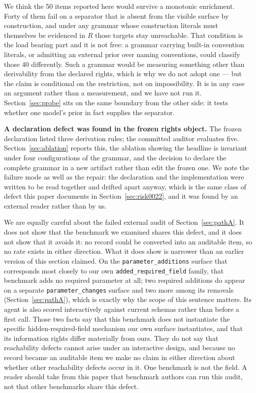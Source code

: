 \documentclass[11pt]{article}
\newcommand{\dfam}[1]{\texttt{#1}}
\begin{document}
We think the 50 items reported here would survive a monotonic enrichment. Forty
of them fail on a separator that is absent from the visible surface by
construction, and under any grammar whose construction literals must themselves
be evidenced in $R$ those targets stay unreachable. That condition is the load
bearing part and it is not free: a grammar carrying built-in convention
literals, or admitting an external prior over naming conventions, could
classify those 40 differently. Such a grammar would be measuring something
other than derivability from the declared rights, which is why we do not adopt
one --- but the claim is conditional on the restriction, not on impossibility.
It is in any case an argument rather than a measurement, and we have not run
it. Section~\ref{sec:probe} sits on the same boundary from the other side: it
tests whether one model's prior in fact supplies the separator.

\textbf{A declaration defect was found in the frozen rights object.} The frozen
declaration listed three derivation rules; the committed auditor evaluates
five. Section~\ref{sec:ablation} reports this, the ablation showing the
headline is invariant under four configurations of the grammar, and the
decision to declare the complete grammar in a new artifact rather than edit the
frozen one. We note the failure mode as well as the repair: the declaration and
the implementation were written to be read together and drifted apart anyway,
which is the same class of defect this paper documents in
Section~\ref{sec:risk0022}, and it was found by an external reader rather than
by us.

We are equally careful about the failed external audit of
Section~\ref{sec:pathA}. It does not show that the benchmark we examined shares
this defect, and it does not show that it avoids it: no record could be
converted into an auditable item, so no rate exists in either direction. What
it does show is narrower than an earlier version of this section claimed. On
the \texttt{parameter\_additions} surface that corresponds most closely to our
own \dfam{added\_required\_field} family, that benchmark adds no required
parameter at all; two required additions do appear on a separate
\texttt{parameter\_changes} surface and two more among its removals
(Section~\ref{sec:pathA}), which is exactly why the scope of this sentence
matters. Its agent is also scored interactively against current schemas rather
than before a first call. Those two facts say that this benchmark does not
instantiate the specific hidden-required-field mechanism our own surface
instantiates, and that its information rights differ materially from ours. They
do not say that reachability defects cannot arise under an interactive design,
and because no record became an auditable item we make no claim in either
direction about whether other reachability defects occur in it. One benchmark
is not the field. A reader should take from this paper that benchmark authors
can run this audit, not that other benchmarks share this defect.
\end{document}
